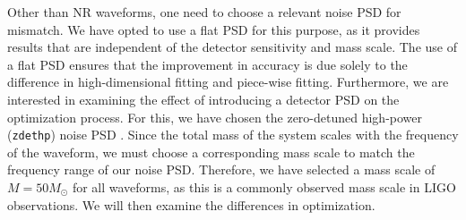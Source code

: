 \documentclass[twocolumn]{aastex631}
\newcommand{\zdethp}{\texttt{zdethp}}
\begin{document}
Other than NR waveforms, one need to choose a relevant noise PSD for 
mismatch. We have opted to use a flat PSD for this purpose, as it provides results that are independent of the detector sensitivity and mass scale. The use of a flat PSD ensures that the improvement in accuracy is due solely to the difference in high-dimensional fitting and piece-wise fitting. Furthermore, we are interested in examining the effect of introducing a detector PSD on the optimization process. For this, we have chosen the zero-detuned high-power (\zdethp) noise PSD \citep{aasi2015advanced}. Since the total mass of the system scales with the frequency of the waveform, we must choose a corresponding mass scale to match the frequency range of our noise PSD. Therefore, we have selected a mass scale of $M=50M_{\odot}$ for all waveforms, as this is a commonly observed mass scale in LIGO observations. We will then examine the differences in optimization.

\end{document}
